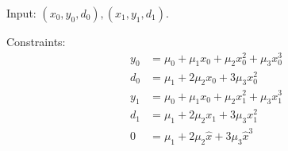 

%

% 
% 
% 
% 

\label{sec:Monomial-cubic-hermite}

Input: $(x_0,y_0,d_0),(x_1,y_1,d_1)$.

Constraints:
\begin{equation}
\begin{aligned}
y_0 & = \mu_0 + \mu_1 x_0 + \mu_2 x_0^{2}  + \mu_3 x_0^{3}  
\\
d_0 & = \mu_1 + 2 \mu_2 x_0 + 3 \mu_3 x_0^{2} 
\\
y_1 & = \mu_0 + \mu_1 x_0+\mu_2 x_1^{2}  + \mu_3 x_1^{3}  
\\
d_1 & = \mu_1 + 2 \mu_2 x_1 + 3 \mu_3 x_1^{2} 
\\
0 & = \mu_1 + 2 \mu_2 \hat{x}  + 3 \mu_3 \hat{x}^3  
\end{aligned}
\end{equation}


